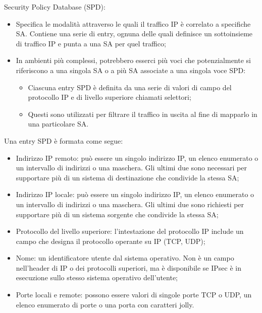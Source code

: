 Security Policy Database (SPD):
\begin{itemize}
    \item Specifica le modalità attraverso le quali il traffico IP è correlato a specifiche SA. Contiene una serie di entry, ognuna delle quali definisce un sottoinsieme di traffico IP e punta a una SA per quel traffico;
	\item In ambienti più complessi, potrebbero esserci più voci che potenzialmente si riferiscono a una singola SA o a più SA associate a una singola voce SPD:
	\begin{itemize}
	    \item Ciascuna entry SPD è definita da una serie di valori di campo del protocollo IP e di livello superiore chiamati selettori;
		\item Questi sono utilizzati per filtrare il traffico in uscita al fine di mapparlo in una particolare SA.
	\end{itemize}
\end{itemize}

Una entry SPD è formata come segue:
\begin{itemize}
    \item Indirizzo IP remoto: può essere un singolo indirizzo IP, un elenco enumerato o un intervallo di indirizzi o una maschera. Gli ultimi due sono necessari per supportare più di un sistema di destinazione che condivide la stessa SA;
	\item Indirizzo IP locale: può essere un singolo indirizzo IP, un elenco enumerato o un intervallo di indirizzi o una maschera. Gli ultimi due sono richiesti per supportare più di un sistema sorgente che condivide la stessa SA;
	\item Protocollo del livello superiore: l'intestazione del protocollo IP include un campo che designa il protocollo operante su IP (TCP, UDP);
	\item Nome: un identificatore utente dal sistema operativo. Non è un campo nell'header di IP o dei protocolli superiori, ma è disponibile se IPsec è in esecuzione sullo stesso sistema operativo dell'utente;
	\item Porte locali e remote: possono essere valori di singole porte TCP o UDP, un elenco enumerato di porte o una porta con caratteri jolly.
\end{itemize}

